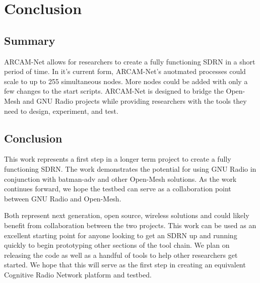 
\chapter{Conclusion} %

\label{Chapter6} %




\section{Summary}

ARCAM-Net allows for researchers to create a fully functioning SDRN in a short period of time. In it's current form, ARCAM-Net's auotmated processes could scale to up to 255 simultaneous nodes. More nodes could be added with only a few changes to the start scripts. ARCAM-Net is designed to bridge the Open-Mesh and GNU Radio projects while providing researchers with the tools they need to design, experiment, and test. 


\section{Conclusion}

This work represents a first step in a longer term project to create a fully functioning SDRN. The work demonstrates the potential for using GNU Radio in conjunction with batman-adv and other Open-Mesh solutions. As the work continues forward, we hope the testbed can serve as a collaboration point between GNU Radio and Open-Mesh.

Both represent next generation, open source, wireless solutions and could likely benefit from collaboration between the two projects. This work can be used as an excellent starting point for anyone looking to get an SDRN up and running quickly to begin prototyping other sections of the tool chain. We plan on releasing the code as well as a handful of tools to help other researchers get started. We hope that this will serve as the first step in creating an equivalent Cognitive Radio Network platform and testbed. 

